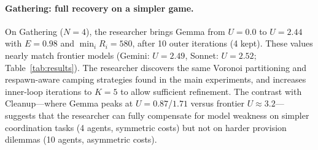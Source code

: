 \documentclass[10pt,twocolumn]{article}
\begin{document}
\paragraph{Gathering: full recovery on a simpler game.}
On Gathering ($N{=}4$), the researcher brings Gemma from $U{=}0.0$ to $U{=}2.44$ with $E{=}0.98$ and $\min_i R_i{=}580$, after 10 outer iterations (4 kept). These values nearly match frontier models (Gemini: $U{=}2.49$, Sonnet: $U{=}2.52$; Table~\ref{tab:results}). The researcher discovers the same Voronoi partitioning and respawn-aware camping strategies found in the main experiments, and increases inner-loop iterations to $K{=}5$ to allow sufficient refinement. The contrast with Cleanup---where Gemma peaks at $U{=}0.87$/$1.71$ versus frontier $U{\approx}3.2$---suggests that the researcher can fully compensate for model weakness on simpler coordination tasks (4 agents, symmetric costs) but not on harder provision dilemmas (10 agents, asymmetric costs).
\end{document}
